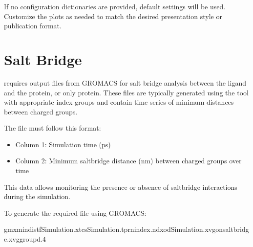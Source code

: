 \documentclass[a4paper,10pt,english]{sphinxmanual}
\begin{document}
\begin{sphinxVerbatim}[commandchars=\\\{\}]
 
\end{sphinxVerbatim}

\sphinxAtStartPar
If no configuration dictionaries are provided, default settings will be used. Customize the plots as needed to match the desired presentation style or publication format.


\section{Salt Bridge}
\label{\detokenize{Input:salt-bridge}}
\sphinxAtStartPar
{} requires  output files from GROMACS for salt bridge analysis between the ligand and the protein, or only protein. These files are typically generated using the  tool with appropriate index groups and contain time series of minimum distances between charged groups.

\sphinxAtStartPar
The  file must follow this format:
\begin{itemize}
\item {} 
\sphinxAtStartPar
Column 1: Simulation time (ps)

\item {} 
\sphinxAtStartPar
Column 2: Minimum salt\sphinxhyphen{}bridge distance (nm) between charged groups over time

\end{itemize}

\sphinxAtStartPar
This data allows monitoring the presence or absence of salt\sphinxhyphen{}bridge interactions during the simulation.

\sphinxAtStartPar
To generate the required  file using GROMACS:

\begin{sphinxVerbatim}[commandchars=\\\{\}]
gmxmindist\PYGZhy{}fSimulation.xtc\PYGZhy{}sSimulation.tpr\PYGZhy{}nindex.ndx\PYGZhy{}odSimulation.xvg\PYGZhy{}onsaltbridge.xvg\PYGZhy{}group\PYGZhy{}d.4
\end{sphinxVerbatim}
\end{document}
